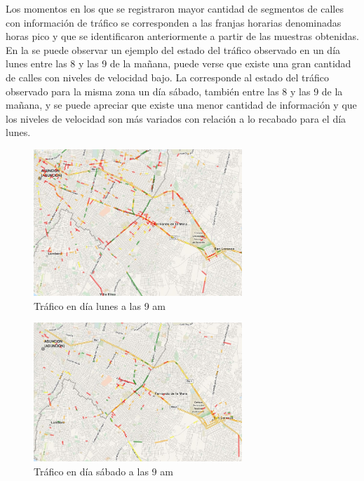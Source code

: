 Los momentos en los que se registraron mayor cantidad de segmentos de calles con información de tráfico se corresponden a las franjas horarias denominadas horas pico y que se identificaron anteriormente a partir de las muestras obtenidas. En la  se puede observar un ejemplo del estado del tráfico observado en un día lunes entre las 8 y las 9 de la mañana, puede verse que existe una gran cantidad de calles con niveles de velocidad bajo. La  corresponde al estado del tráfico observado para la misma zona un día sábado, también entre las 8 y las 9 de la mañana, y se puede apreciar que existe una menor cantidad de información y que los niveles de velocidad son más variados con relación a lo recabado para el día lunes.

\begin{figure}[!ht]
	\centering
	\includegraphics[width=0.7\textwidth]{capitulos/7/figuras/figura6.jpg}
	\caption{\label{fig:trafico_lunes} Tráfico en día lunes a las 9 am}	
\end{figure}

\begin{figure}[!ht]
	\centering
	\includegraphics[width=0.7\textwidth]{capitulos/7/figuras/figura7.jpg}
	\caption{\label{fig:trafico_sabado} Tráfico en día sábado a las 9 am}	
\end{figure}

